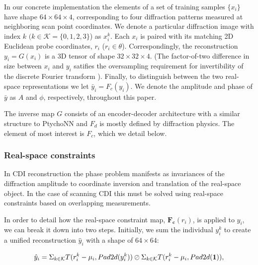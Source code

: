 \documentclass[sn-mathphys]{sn-jnl}%
\theoremstyle{thmstyleone}%
\theoremstyle{thmstyletwo}%
\theoremstyle{thmstylethree}%
\begin{document}
In our concrete implementation the elements of a set of training samples $\{x_i\}$ have shape $64 \times 64 \times 4$, corresponding to four diffraction patterns measured at neighboring scan point coordinates. We denote a particular diffraction image with index $k$ $(k \in \mathcal{K} = \{0, 1, 2, 3\}$) as $x_i^k$. Each $x_i$ is paired with its matching 2D Euclidean probe coordinates, $r_i$ ($r_i \in \theta$). Correspondingly, the reconstruction $y_i = G(x_i)$ is a 3D tensor of shape $32 \times 32 \times 4$. (The factor-of-two difference in size between $x_i$ and $y_i$ satifies the oversampling requirement for invertibility of the discrete Fourier transform \cite{miao2000oversampling}). Finally, to distinguish between the two real-space representations we let $\bar{y}_i = F_c(y_i)$. We denote the amplitude and phase of $\bar{y}$ as $A$ and $\phi$, respectively, throughout this paper.

The inverse map $G$ consists of an encoder-decoder architecture with a similar structure to PtychoNN and $F_d$ is mostly defined by diffraction physics. The element of most interest is $F_c$, which we detail below.


\subsubsection{Real-space constraints}
In CDI reconstruction the phase problem manifests as invariances of the diffraction amplitude to coordinate inversion and translation of the real-space object. In the case of scanning CDI this must be solved using real-space constraints based on overlapping measurements.

In order to detail how the real-space constraint map, $\mathbf{F_c}(r_i)$, is applied to $y_i$, we can break it down into two steps. Initially, we sum the individual $y_i^k$ to create a unified reconstruction $\hat{y}_i$ with a shape of $64 \times 64$:
%


\begin{equation} 
\hat{y}_i = \Sigma_{k \in \mathcal{K}} T(r_i^k - \mu_i, Pad2d(y_i^k))
\oslash
\Sigma_{k \in \mathcal{K}} T(r_i^k - \mu_i, Pad2d(\bf{1})), 
\label{eq:1}
\end{equation}
\end{document}
